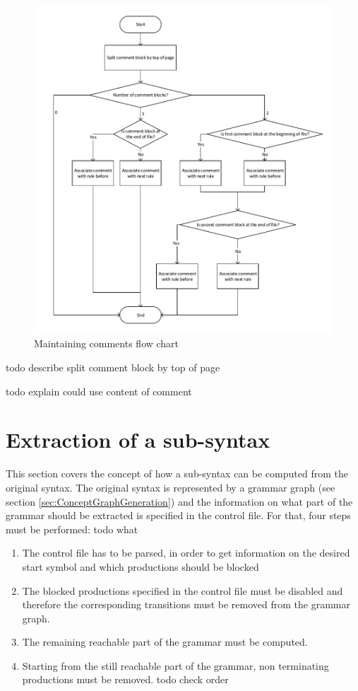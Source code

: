 \begin{figure}[H]
\centering
\includegraphics[width=1\textwidth]{images/Concept_maintaining_comments.pdf}
\caption{Maintaining comments flow chart}
\label{fig:ConceptMaintainingComments}
\end{figure}
todo describe split comment block by top of page

todo explain could use content of comment
\section{Extraction of a sub-syntax}\label{sec:ConceptExtractReducedGrammar}
This section covers the concept of how a sub-syntax can be computed from the original syntax.
The original syntax is represented by a grammar graph (see section \ref{sec:ConceptGraphGeneration}) and the information on what part of the grammar should be extracted is specified in the control file.
For that, four steps must be performed:
todo what
\begin{enumerate}%
	\item The control file has to be parsed, in order to get information on the desired start symbol and which productions should be blocked
	\item The blocked productions specified in the control file must be disabled and therefore the corresponding transitions must be removed from the grammar graph.
	\item The remaining reachable part of the grammar must be computed.
	\item Starting from the still reachable part of the grammar, non terminating productions must be removed.
	todo check order
\end{enumerate}

